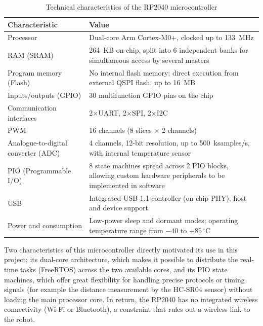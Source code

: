 \documentclass[12pt,a4paper]{report}
\begin{document}
	\begin{table}[H]
		\centering
		\small
		\renewcommand{\arraystretch}{1.15}
		\begin{tabularx}{\textwidth}{|l|X|}
			\hline
			\textbf{Characteristic} & \textbf{Value} \\
			\hline
			Processor & Dual-core Arm Cortex-M0+, clocked up to 133~MHz \\
			\hline
			RAM (SRAM) & 264~KB on-chip, split into 6 independent banks for simultaneous access by several masters \\
			\hline
			Program memory (Flash) & No internal flash memory; direct execution from external QSPI flash, up to 16~MB \\
			\hline
			Inputs/outputs (GPIO) & 30 multifunction GPIO pins on the chip \\
			\hline
			Communication interfaces & 2$\times$UART, 2$\times$SPI, 2$\times$I2C \\
			\hline
			PWM & 16 channels (8 slices $\times$ 2 channels) \\
			\hline
			Analogue-to-digital converter (ADC) & 4 channels, 12-bit resolution, up to 500~ksamples/s, with internal temperature sensor \\
			\hline
			PIO (Programmable I/O) & 8 state machines spread across 2 PIO blocks, allowing custom hardware peripherals to be implemented in software \\
			\hline
			USB & Integrated USB 1.1 controller (on-chip PHY), host and device support \\
			\hline
			Power and consumption & Low-power sleep and dormant modes; operating temperature range from $-40$ to $+85\,^{\circ}$C \\
			\hline
		\end{tabularx}
		\caption{Technical characteristics of the RP2040 microcontroller}
		\label{tab:rp2040-specs}
	\end{table}
	
	Two characteristics of this microcontroller directly motivated its use in this project: its dual-core architecture, which makes it possible to distribute the real-time tasks (FreeRTOS) across the two available cores, and its PIO state machines, which offer great flexibility for handling precise protocols or timing signals (for example the distance measurement by the HC-SR04 sensor) without loading the main processor core. In return, the RP2040 has no integrated wireless connectivity (Wi-Fi or Bluetooth), a constraint that rules out a wireless link to the robot.
	
\end{document}
